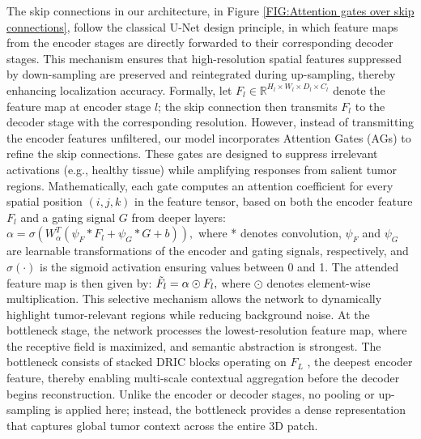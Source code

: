The skip connections in our architecture, in Figure \ref{FIG:Attention gates over skip connections}, follow the classical U-Net design principle, in which feature maps from the encoder stages are directly forwarded to their corresponding decoder stages. This mechanism ensures that high-resolution spatial features suppressed by down-sampling are preserved and reintegrated during up-sampling, thereby enhancing localization accuracy. Formally, let $F_l\in \mathbb{R}^{H_l\times W_l\times D_l\times C_l}$ denote the feature map at encoder stage $l$; the skip connection then transmits $F_l$ to the decoder stage with the corresponding resolution.
However, instead of transmitting the encoder features unfiltered, our model incorporates Attention Gates (AGs) to refine the skip connections. These gates are designed to suppress irrelevant activations (e.g., healthy tissue) while amplifying responses from salient tumor regions. Mathematically, each gate computes an attention coefficient for every spatial position $(i,j,k)$ in the feature tensor, based on both the encoder feature $F_l$ and a gating signal $G$ from deeper layers: $\alpha =\sigma (W_\alpha^T (\psi_F * F_l + \psi_G * G + b)),$ where * denotes convolution, $\psi_F$ and $\psi_G$ are learnable transformations of the encoder and gating signals, respectively, and $\sigma(\cdot)$ is the sigmoid activation ensuring values between 0 and 1. The attended feature map is then given by: $\Tilde{F}_l = \alpha \odot F_l,$ where $\odot$ denotes element-wise multiplication. This selective mechanism allows the network to dynamically highlight tumor-relevant regions while reducing background noise.
At the bottleneck stage, the network processes the lowest-resolution feature map, where the receptive field is maximized, and semantic abstraction is strongest. The bottleneck consists of stacked DRIC blocks operating on $F_L$ , the deepest encoder feature, thereby enabling multi-scale contextual aggregation before the decoder begins reconstruction. Unlike the encoder or decoder stages, no pooling or up-sampling is applied here; instead, the bottleneck provides a dense representation that captures global tumor context across the entire 3D patch.
